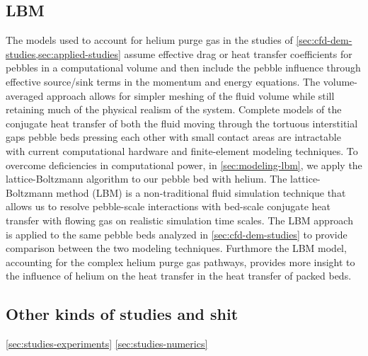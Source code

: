 \subsection{LBM}
The models used to account for helium purge gas in the studies of \cref{sec:cfd-dem-studies,sec:applied-studies} assume effective drag or heat transfer coefficients for pebbles in a computational volume and then include the pebble influence through effective source/sink terms in the momentum and energy equations. The volume-averaged approach allows for simpler meshing of the fluid volume while still retaining much of the physical realism of the system. Complete models of the conjugate heat transfer of both the fluid moving through the tortuous interstitial gaps pebble beds pressing each other with small contact areas are intractable with current computational hardware and finite-element modeling techniques. To overcome deficiencies in computational power, in \cref{sec:modeling-lbm}, we apply the lattice-Boltzmann algorithm to our pebble bed with helium. The lattice-Boltzmann method (LBM) is a non-traditional fluid simulation technique that allows us to resolve pebble-scale interactions with bed-scale conjugate heat transfer with flowing gas on realistic simulation time scales. The LBM approach is applied to the same pebble beds analyzed in \cref{sec:cfd-dem-studies} to provide comparison between the two modeling techniques. Furthmore the LBM model, accounting for the complex helium purge gas pathways, provides more insight to the influence of helium on the heat transfer in the heat transfer of packed beds.


\subsection{Other kinds of studies and shit}
\cref{sec:studies-experiments}
\cref{sec:studies-numerics}









